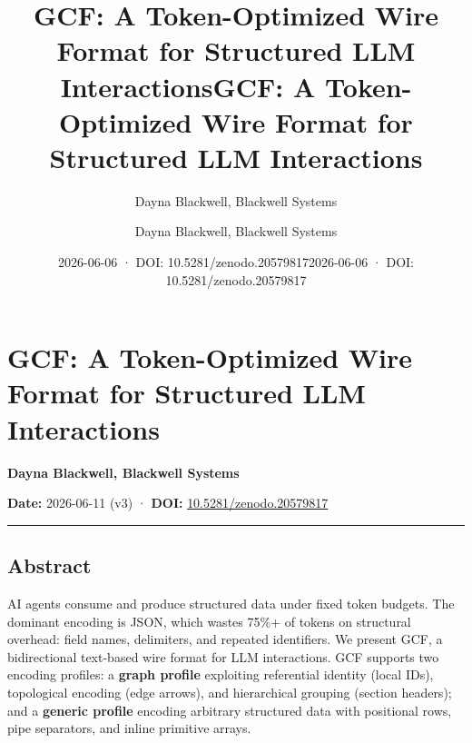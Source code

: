 \documentclass[
  11pt,
  paper=a4,
  ,captions=tableheading
]{scrartcl}
\title{GCF: A Token-Optimized Wire Format for Structured LLM
Interactions}
\author{Dayna Blackwell, Blackwell Systems}
\date{2026-06-06 · DOI: 10.5281/zenodo.20579817}
\title{GCF: A Token-Optimized Wire Format for Structured LLM
Interactions}
\author{Dayna Blackwell, Blackwell Systems}
\date{2026-06-06 · DOI: 10.5281/zenodo.20579817}
\begin{document}
\begin{titlepage}
\afterpage{\restorepagecolor}
\newcommand{\colorRule}[3][black]{\textcolor[HTML]{#1}{\rule{#2}{#3}}}
\end{titlepage}
\restoregeometry
{}



{
\setcounter{tocdepth}{3}
\tableofcontents
\newpage
}
\section{GCF: A Token-Optimized Wire Format for Structured LLM
Interactions}\label{gcf-a-token-optimized-wire-format-for-structured-llm-interactions}

\textbf{Dayna Blackwell, Blackwell Systems}

\textbf{Date:} 2026-06-11 (v3) · \textbf{DOI:}
\href{https://doi.org/10.5281/zenodo.20579817}{10.5281/zenodo.20579817}

\begin{center}\rule{0.5\linewidth}{0.5pt}\end{center}

\subsection{Abstract}\label{abstract}

AI agents consume and produce structured data under fixed token budgets.
The dominant encoding is JSON, which wastes 75\%+ of tokens on
structural overhead: field names, delimiters, and repeated identifiers.
We present GCF, a bidirectional text-based wire format for LLM
interactions. GCF supports two encoding profiles: a \textbf{graph
profile} exploiting referential identity (local IDs), topological
encoding (edge arrows), and hierarchical grouping (section headers); and
a \textbf{generic profile} encoding arbitrary structured data with
positional rows, pipe separators, and inline primitive arrays.
\end{document}
